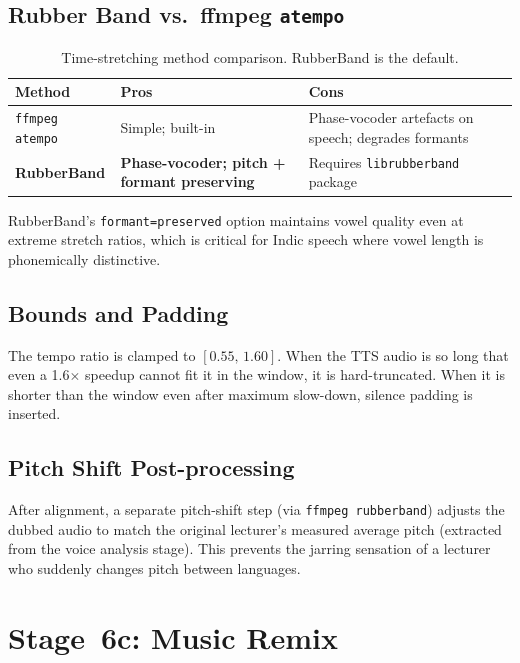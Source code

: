 \documentclass[12pt,a4paper]{article}
\begin{document}
\subsection{Rubber Band vs.\ ffmpeg \texttt{atempo}}

\begin{table}[H]
\centering
\begin{tabularx}{\linewidth}{lXX}
\toprule
\textbf{Method} & \textbf{Pros} & \textbf{Cons} \\
\midrule
\texttt{ffmpeg atempo}  & Simple; built-in & Phase-vocoder artefacts on speech; degrades formants \\
\textbf{RubberBand}     & \textbf{Phase-vocoder; pitch + formant preserving} & Requires \texttt{librubberband} package \\
\bottomrule
\end{tabularx}
\caption{Time-stretching method comparison.  RubberBand is the default.}
\end{table}

RubberBand's \texttt{formant=preserved} option maintains vowel quality even
at extreme stretch ratios, which is critical for Indic speech where vowel
length is phonemically distinctive.

\subsection{Bounds and Padding}

The tempo ratio is clamped to $[0.55,\,1.60]$.  When the TTS audio is
so long that even a 1.6$\times$ speedup cannot fit it in the window,
it is hard-truncated.  When it is shorter than the window even after
maximum slow-down, silence padding is inserted.

\subsection{Pitch Shift Post-processing}

After alignment, a separate pitch-shift step (via \texttt{ffmpeg rubberband})
adjusts the dubbed audio to match the original lecturer's measured average
pitch (extracted from the voice analysis stage).  This prevents the jarring
sensation of a lecturer who suddenly changes pitch between languages.

\section{Stage~6c: Music Remix}
\end{document}
